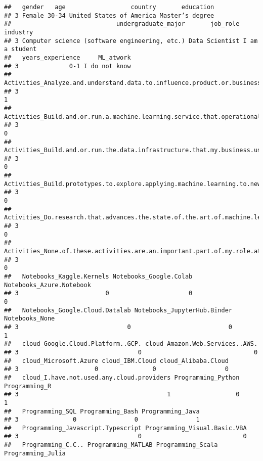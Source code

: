 \documentclass[
]{article}
\begin{document}
\begin{verbatim}
##   gender   age                  country       education
## 3 Female 30-34 United States of America Master’s degree
##                             undergraduate_major       job_role       industry
## 3 Computer science (software engineering, etc.) Data Scientist I am a student
##   years_experience     ML_atwork
## 3              0-1 I do not know
##   Activities_Analyze.and.understand.data.to.influence.product.or.business.decisions
## 3                                                                                 1
##   Activities_Build.and.or.run.a.machine.learning.service.that.operationally.improves.my.product.or.workflows
## 3                                                                                                          0
##   Activities_Build.and.or.run.the.data.infrastructure.that.my.business.uses.for.storing..analyzing..and.operationalizing.data
## 3                                                                                                                           0
##   Activities_Build.prototypes.to.explore.applying.machine.learning.to.new.areas
## 3                                                                             0
##   Activities_Do.research.that.advances.the.state.of.the.art.of.machine.learning
## 3                                                                             0
##   Activities_None.of.these.activities.are.an.important.part.of.my.role.at.work
## 3                                                                            0
##   Notebooks_Kaggle.Kernels Notebooks_Google.Colab Notebooks_Azure.Notebook
## 3                        0                      0                        0
##   Notebooks_Google.Cloud.Datalab Notebooks_JupyterHub.Binder Notebooks_None
## 3                              0                           0              1
##   cloud_Google.Cloud.Platform..GCP. cloud_Amazon.Web.Services..AWS.
## 3                                 0                               0
##   cloud_Microsoft.Azure cloud_IBM.Cloud cloud_Alibaba.Cloud
## 3                     0               0                   0
##   cloud_I.have.not.used.any.cloud.providers Programming_Python Programming_R
## 3                                         1                  0             1
##   Programming_SQL Programming_Bash Programming_Java
## 3               0                0                1
##   Programming_Javascript.Typescript Programming_Visual.Basic.VBA
## 3                                 0                            0
##   Programming_C.C.. Programming_MATLAB Programming_Scala Programming_Julia

\end{verbatim}
\end{document}
